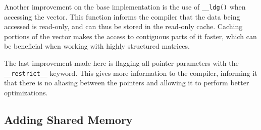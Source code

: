 \documentclass[conference]{IEEEtran}
\begin{document}
Another improvement on the base implementation is the use of \texttt{\_\_ldg()} when accessing the vector. This function informs the compiler that the data being accessed is read-only, and can thus be stored in the read-only cache.\cite{cuda_ldg} Caching portions of the vector makes the access to contiguous parts of it faster, which can be beneficial when working with highly structured matrices.

The last improvement made here is flagging all pointer parameters with the \texttt{\_\_restrict\_\_} keyword\cite{cuda_restrict}. This gives more information to the compiler, informing it that there is no aliasing between the pointers and allowing it to perform better optimizations.

\subsection{Adding Shared Memory}
\end{document}
